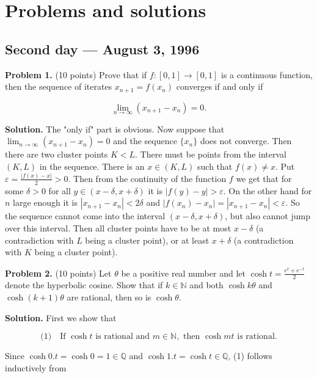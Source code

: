 \documentclass{article}
\begin{document}
\pagestyle{plain}

\section*{Problems and solutions}

\subsection*{Second day — August 3, 1996}

\textbf{Problem 1.} (10 points)
Prove that if \( f : [0,1] \to [0,1] \) is a continuous function, then the sequence of iterates \( x_{n+1} = f(x_n) \) converges if and only if

\[
\lim_{n \to \infty} (x_{n+1} - x_n) = 0.
\]

\textbf{Solution.} The "only if" part is obvious.
Now suppose that \( \lim_{n \to \infty} (x_{n+1} - x_n) = 0 \) and
the sequence \( \{x_n\} \) does not converge.
Then there are two cluster points \( K < L \). There must be points
from the interval \( (K, L) \) in the sequence.
There is an \( x \in (K, L) \) such that \( f(x) \neq x \).
Put \( \varepsilon = \frac{|f(x) - x|}{2} > 0 \).
Then from the continuity of the function \( f \) we get that
for some \( \delta > 0 \) for all \( y \in (x - \delta, x + \delta) \)
it is \( |f(y) - y| > \varepsilon \). On the other hand for \( n \)
large enough it is \( |x_{n+1} - x_n| < 2\delta \)
and \( |f(x_n) - x_n| = |x_{n+1} - x_n| < \varepsilon \).
So the sequence cannot come into the interval \( (x - \delta, x + \delta) \),
but also cannot jump over this interval.
Then all cluster points have to be at most \( x - \delta \)
(a contradiction with \( L \) being a cluster point),
or at least \( x + \delta \) (a contradiction with \( K \) being a cluster point).

\textbf{Problem 2.} (10 points)
Let \(\theta\) be a positive real number and let \(\cosh t = \frac{e^t + e^{-t}}{2}\) denote the hyperbolic cosine. Show that if \(k \in \mathbb{N}\) and both \(\cosh k\theta\) and \(\cosh (k + 1)\theta\) are rational, then so is \(\cosh \theta\).

\textbf{Solution.} First we show that

\[
\text{(1)} \quad \text{If } \cosh t \text{ is rational and } m \in \mathbb{N}, \text{ then } \cosh mt \text{ is rational.}
\]

Since \(\cosh 0.t = \cosh 0 = 1 \in \mathbb{Q}\) and \(\cosh 1.t = \cosh t \in \mathbb{Q}\), (1) follows inductively from
\end{document}
